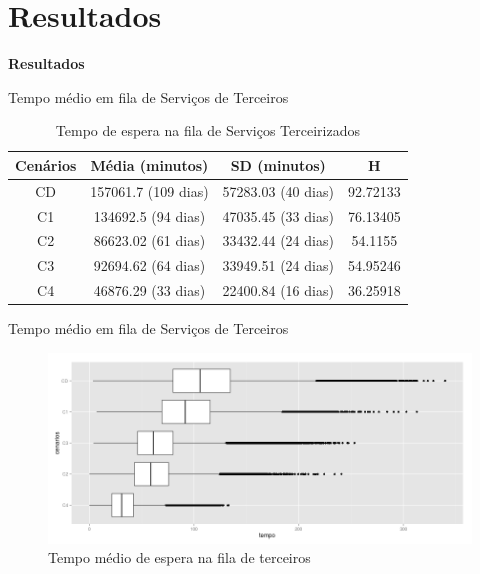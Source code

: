 \documentclass[xcolor=dvipsnames]{beamer}
\begin{document}
\section{Resultados}

\begin{frame}{}
	\centering
	\Huge \color{blue} \textbf{Resultados}
\end{frame}

\begin{frame}{Tempo médio em fila de Serviços de Terceiros}
	\begin{table}[H]
		\centering
		\begin{tabular}{|c|c|c|c|}
			\hline
			\textbf{Cenários} & \textbf{Média (minutos)}\footnotemark & \textbf{SD (minutos) }\footnotemark & \textbf{H} \\ \hline
			CD                 & 157061.7 (109 dias)                    & 57283.03 (40 dias)                  & 92.72133   \\ \hline
			C1                 & 134692.5 (94 dias)                     & 47035.45 (33 dias)                  & 76.13405   \\ \hline
			C2                 & 86623.02 (61 dias)                     & 33432.44 (24 dias)                  & 54.1155    \\ \hline
			C3                 & 92694.62 (64 dias)                     & 33949.51 (24 dias)                  & 54.95246   \\ \hline
			C4                 & 46876.29 (33 dias)                     & 22400.84 (16 dias)                  & 36.25918   \\ \hline
		\end{tabular}
		\caption {Tempo de espera na fila de Serviços Terceirizados}
	\end{table}
\end{frame}

\begin{frame}{Tempo médio em fila de Serviços de Terceiros}
	\begin{figure}[H]
		\centering
		\includegraphics[width=1\linewidth]{img/final.png}
		\caption{Tempo médio de espera na fila de terceiros}
		\label{fig:box}
	\end{figure}
\end{frame}
	
\end{document}
